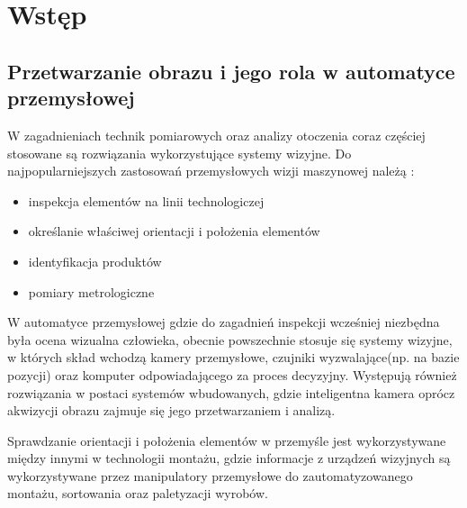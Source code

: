 \documentclass[document.tex]{subfiles}
\begin{document}
\chapter{Wstęp}

\section{Przetwarzanie obrazu i jego rola w automatyce przemysłowej}
	\indent W zagadnieniach technik pomiarowych oraz analizy otoczenia coraz częściej stosowane
	są rozwiązania wykorzystujące systemy wizyjne. Do najpopularniejszych zastosowań przemysłowych wizji maszynowej należą \cite{Machine_Vision_Intro}:
	\begin{itemize}
		\item inspekcja elementów na linii technologiczej
		\item określanie właściwej orientacji i położenia elementów
		\item identyfikacja produktów
		\item pomiary metrologiczne		
	\end{itemize}
	\indent W automatyce przemysłowej gdzie do zagadnień inspekcji
	wcześniej niezbędna była ocena wizualna człowieka, obecnie powszechnie stosuje się systemy wizyjne, 
	w których skład wchodzą kamery przemysłowe, czujniki wyzwalające(np. na bazie pozycji) oraz komputer odpowiadającego za proces decyzyjny.
	Występują również rozwiązania w postaci systemów wbudowanych, gdzie inteligentna kamera oprócz
	akwizycji obrazu zajmuje się jego przetwarzaniem i analizą.\cite{Machine_Vision_Intro}\cite{Davies_Machine_Vision}
	


	\indent Sprawdzanie orientacji i położenia elementów w przemyśle jest wykorzystywane
	między innymi w technologii montażu, gdzie informacje z urządzeń wizyjnych są wykorzystywane
	przez manipulatory przemysłowe do zautomatyzowanego montażu, sortowania oraz paletyzacji wyrobów.\cite{Machine_Vision_Intro}

\end{document}
